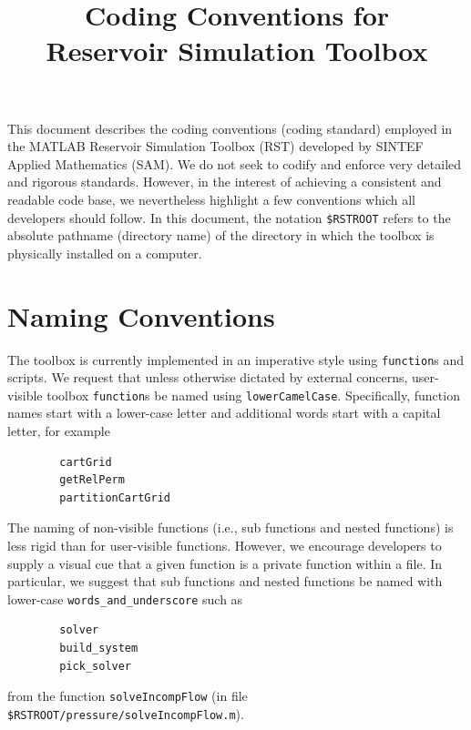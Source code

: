 \documentclass[11pt,twoside,UKenglish]{scrartcl}
\title {Coding Conventions for\\{\MATLAB} Reservoir Simulation Toolbox}
\author{{\SAM}}
\date{\svndate}
\newcommand{\SINTEF}  {\textsc{SINTEF}}
\newcommand{\MATLAB}  {\textsc{MATLAB}}
\newcommand{\rstroot} {\texttt{\$RSTROOT}}
\newcommand{\MATLABKeyword}[1]{\texttt{#1}}
\newcommand{\FileName}     [1]{\texttt{#1}}
\newcommand{\FunctionName} [1]{\texttt{#1}}
\newcommand{\function}        {\MATLABKeyword{function}}
\begin{document}
\maketitle\thispagestyle{empty}
This document describes the coding conventions (coding standard)
employed in the {\MATLAB} Reservoir Simulation Toolbox (RST) developed
by {\SINTEF} Applied Mathematics (SAM).  We do not seek to codify and
enforce very detailed and rigorous standards.  However, in the interest
of achieving a consistent and readable code base, we nevertheless
highlight a few conventions which all developers should follow.  In this
document, the notation {\rstroot} refers to the absolute pathname
(directory name) of the directory in which the toolbox is physically
installed on a computer.


\section{Naming Conventions}
The toolbox is currently implemented in an imperative style using
{\function}s and scripts.  We request that unless otherwise dictated by
external concerns, user-visible toolbox {\function}s be named using
\FunctionName{lowerCamelCase}.  Specifically, function names start with a
lower-case letter and additional words start with a capital letter, for
example
\begin{verbatim}
        cartGrid
        getRelPerm
        partitionCartGrid
\end{verbatim}
The naming of non-visible functions (i.e., sub functions and nested
functions) is less rigid than for user-visible functions.  However, we
encourage developers to supply a visual cue that a given function is a
private function within a file.  In particular, we suggest that sub
functions and nested functions be named with lower-case
\FunctionName{words\_and\_underscore} such as
\begin{verbatim}
        solver
        build_system
        pick_solver
\end{verbatim}
from the function \FunctionName{solveIncompFlow} (in file
\FileName{\rstroot/pressure/solveIncompFlow.m}).
\end{document}
